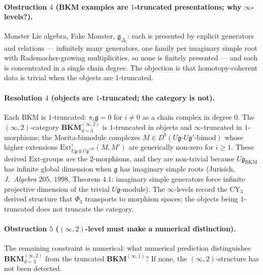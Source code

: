 \paragraph{Obstruction \texorpdfstring{$4$}{4} (BKM examples are $1$-truncated
presentations; why \texorpdfstring{$\infty$}{inf}-levels?).}
Monster Lie algebra, Fake Monster, $\mathfrak g_{\Delta_5}$: each is
presented by explicit generators and relations --- infinitely many
generators, one family per imaginary simple root with
Rademacher-growing multiplicities, so none is finitely presented ---
and each is concentrated in a single chain degree. The objection is
that homotopy-coherent data is trivial when the objects are
$1$-truncated.

\paragraph{Resolution \texorpdfstring{$4$}{4} (objects are \texorpdfstring{$1$}{1}-truncated; the category is not).}
Each BKM is $1$-truncated: $\pi_i\mathfrak g=0$ for $i\neq 0$ as a
chain complex in degree $0$. The $(\infty,2)$-category
$\mathbf{BKM}^{(\infty,2)}_{d=3}$ is $1$-truncated in objects and
$\infty$-truncated in $1$-morphisms; the Morita-bimodule complexes
$M\in D^b(U\mathfrak g\text{-}U\mathfrak g'\text{-}\mathrm{bimod})$
whose higher extensions $\mathrm{Ext}^i_{U\mathfrak g\otimes
U\mathfrak g'^{\mathrm{op}}}(M,M')$ are generically non-zero for
$i\geq 1$. These derived $\mathrm{Ext}$-groups \emph{are} the
$2$-morphisms, and they are non-trivial because
$U\mathfrak g_{\mathrm{BKM}}$ has infinite global dimension when
$\mathfrak g$ has imaginary simple roots (Jurisich,
\emph{J.\ Algebra} $205$, $1998$, Theorem $4$.$1$: imaginary simple
generators force infinite projective dimension of the trivial
$U\mathfrak g$-module). The $\infty$-levels record the CY$_3$
derived structure that $\Phi_3$ transports to morphism spaces; the
objects being $1$-truncated does not truncate the category.

\paragraph{Obstruction \texorpdfstring{$5$}{5} (\texorpdfstring{$(\infty,2)$}{(inf,2)}-level must make a numerical distinction).}
The remaining constraint is numerical: what
numerical prediction distinguishes $\mathbf{BKM}^{(\infty,2)}_{d=3}$
from the truncated $\mathbf{BKM}^{(\infty,1)}$? If none, the
$(\infty,2)$-structure has not been detected.

